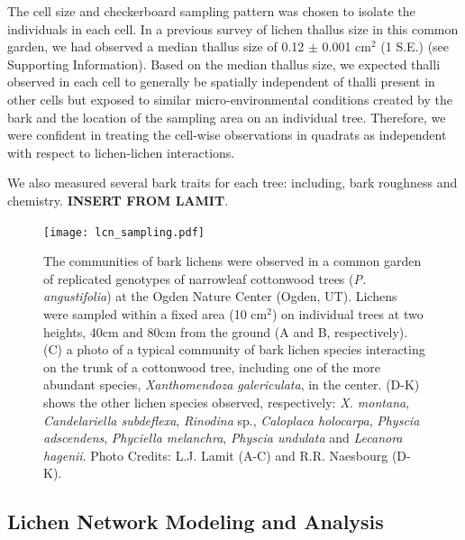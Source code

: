 \documentclass[11pt,twocolumn,twoside,lineno]{pnas-new}
\begin{document}
{The cell size and checkerboard sampling pattern was chosen to isolate
the individuals in each cell. In a previous survey of lichen thallus
size in this common garden, we had observed a median thallus size of
0.12 $\pm$ 0.001 cm$^2$ (1 S.E.) (see Supporting Information). Based
on the median thallus size, we expected thalli observed in each cell
to generally be spatially independent of thalli present in other cells
but exposed to similar micro-environmental conditions created by the
bark and the location of the sampling area on an individual
tree. Therefore, we were confident in treating the cell-wise
observations in quadrats as independent with respect to lichen-lichen
interactions.


We also measured several bark traits for each tree: including, bark
roughness and chemistry. \textbf{INSERT FROM LAMIT}.



\begin{figure}[ht]
\centering
\texttt{[image: lcn\_sampling.pdf]}
\caption{The communities of bark lichens were observed in a common
  garden of replicated genotypes of narrowleaf cottonwood trees
  (\textit{P. angustifolia}) at the Ogden Nature Center (Ogden,
  UT). Lichens were sampled within a fixed area (10 cm$^2$) on
  individual trees at two heights, 40cm and 80cm from the ground (A
  and B, respectively). (C) a photo of a typical community of bark
  lichen species interacting on the trunk of a cottonwood tree,
  including one of the more abundant species, \textit{Xanthomendoza
    galericulata}, in the center. (D-K) shows the other lichen species
  observed, respectively:  \textit{X. montana}, \textit{Candelariella
    subdeflexa}, \textit{Rinodina} sp., \textit{Caloplaca holocarpa},
  \textit{Physcia adscendens}, \textit{Phyciella melanchra},
  \textit{Physcia undulata} and \textit{Lecanora hagenii}. Photo
  Credits: L.J. Lamit (A-C) and R.R. Naesbourg (D-K).}
\label{fig:lichen_sampling}
\end{figure}


\subsection*{Lichen Network Modeling and Analysis}

}
\end{document}
